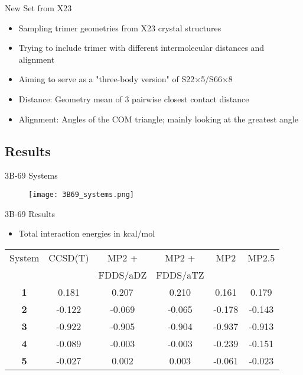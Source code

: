 \documentclass{beamer}
\begin{document}
        \begin{frame}{New Set from X23}
            \begin{itemize}
                \item Sampling trimer geometries from X23 crystal structures
                \item Trying to include trimer with different intermolecular distances and alignment 
                \item Aiming to serve as a "three-body version" of S22$\times$5/S66$\times$8
                \item Distance: Geometry mean of 3 pairwise closest contact distance
                \item Alignment: Angles of the COM triangle; mainly looking at the greatest angle
            \end{itemize}
        \end{frame}

    \subsection{Results}

        \begin{frame}{3B-69 Systems}
            \begin{figure}
                \centering
                \texttt{[image: 3B69\_systems.png]}
            \end{figure}
        \end{frame}
        
        \begin{frame}{3B-69 Results}
            \begin{itemize}
                \item Total interaction energies in kcal/mol
            \end{itemize}
            \begin{table}
                \centering
                \begin{tabular}{c c c c c c}
                    \hline
                    System & CCSD(T) & MP2 + & MP2 + & MP2 & MP2.5 \\
                           & & FDDS/aDZ & FDDS/aTZ & & \\ \hline
                    \textbf{1} & 0.181 & 0.207 & 0.210 & 0.161 & 0.179 \\ 
                    \textbf{2} & -0.122 & -0.069 & -0.065 & -0.178 & -0.143 \\
                    \textbf{3} & -0.922 & -0.905 & -0.904 & -0.937 & -0.913 \\
                    \textbf{4} & -0.089 & -0.003 & -0.003 & -0.239 & -0.151 \\
                    \textbf{5} & -0.027 & 0.002 & 0.003 & -0.061 & -0.023 \\ \hline
                \end{tabular}
            \end{table}
        \end{frame}
        
\end{document}
